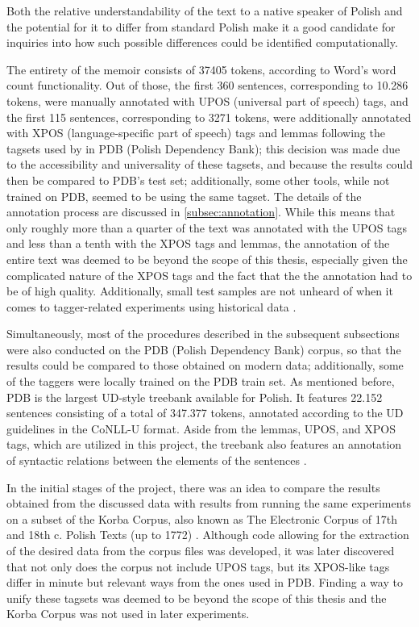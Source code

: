 Both the relative understandability of the text to a native speaker of Polish and the potential for it to differ from standard Polish make it a good candidate for inquiries into how such possible differences could be identified computationally.

The entirety of the memoir consists of 37405 tokens, according to Word's word count functionality. Out of those, the first 360 sentences, corresponding to 10.286 tokens, were manually annotated with UPOS (universal part of speech) tags, and the first 115 sentences, corresponding to 3271 tokens, were additionally annotated with XPOS (language-specific part of speech) tags and lemmas following the tagsets used by \citet{wroblewska-2018-extended} in PDB (Polish Dependency Bank); this decision was made due to the accessibility and universality of these tagsets, and because the results could then be compared to PDB's test set; additionally, some other tools, while not trained on PDB, seemed to be using the same tagset. The details of the annotation process are discussed in \autoref{subsec:annotation}. While this means that only roughly more than a quarter of the text was annotated with the UPOS tags and less than a tenth with the XPOS tags and lemmas, the annotation of the entire text was deemed to be beyond the scope of this thesis, especially given the complicated nature of the XPOS tags and the fact that the the annotation had to be of high quality. Additionally, small test samples are not unheard of when it comes to tagger-related experiments using historical data \citep{bollmann-2013-pos, hupkes16, rayson07}. 

Simultaneously, most of the procedures described in the subsequent subsections were also conducted on the PDB (Polish Dependency Bank) corpus, so that the results could be compared to those obtained on modern data; additionally, some of the taggers were locally trained on the PDB train set. As mentioned before, PDB is the largest UD-style treebank available for Polish. It features 22.152 sentences consisting of a total of 347.377 tokens, annotated according to the UD guidelines in the CoNLL-U format. Aside from the lemmas, UPOS, and XPOS tags, which are utilized in this project, the treebank also features an annotation of syntactic relations between the elements of the sentences \citep{wroblewska-2018-extended, universaldependencies}.

In the initial stages of the project, there was an idea to compare the results obtained from the discussed data with results from running the same experiments on a subset of the Korba Corpus, also known as The Electronic Corpus of 17th and 18th c. Polish Texts (up to 1772) \citep{korba}. Although code allowing for the extraction of the desired data from the corpus files was developed, it was later discovered that not only does the corpus not include UPOS tags, but its XPOS-like tags differ in minute but relevant ways from the ones used in PDB. Finding a way to unify these tagsets was deemed to be beyond the scope of this thesis and the Korba Corpus was not used in later experiments. 

